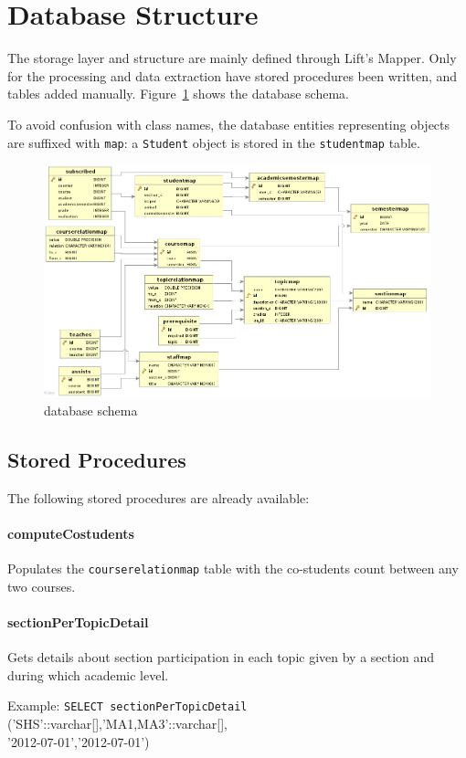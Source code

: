\section{Database Structure}
The storage layer and structure are mainly defined through Lift's Mapper. Only for the processing and data extraction have stored procedures been written, and tables added manually. Figure~\ref{fig:db_schema} shows the database schema.

To avoid confusion with class names, the database entities representing objects are suffixed with \verb|map|: a \verb|Student| object is stored in the \verb|studentmap| table.

\begin{figure}
\center
\includegraphics[angle=-90, width=.85\columnwidth]{schema_extended.png}
\caption{database schema}
\label{fig:db_schema}
\end{figure}

\subsection{Stored Procedures}
The following stored procedures are already available:
\paragraph{computeCostudents}
Populates the \verb|courserelationmap| table with the co-students count between any two courses.

\paragraph{sectionPerTopicDetail} Gets details about section participation in each topic given by a section and during which academic level.

Example: \verb|SELECT sectionPerTopicDetail| ('{SHS}'::varchar[],'{MA1,MA3}'::varchar[],\\'2012-07-01','2012-07-01')

